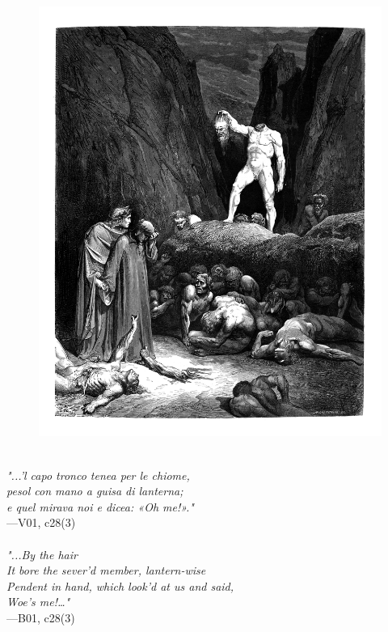 \documentclass[../Dore_vision.tex]{subfiles}
\begin{document}
\begin{figure}[ht]
\centering
\includegraphics[height=\figsize]{illustrations/book_1/V01, c28(3).jpg}
\end{figure}

\begin{center}
\begin{minipage}{0.8\linewidth}
\textit{\\
"...’l capo tronco tenea per le chiome,\\pesol con mano a guisa di lanterna;\\e quel mirava noi e dicea: «Oh me!»."} \\
—V01, c28(3) \\~\\
\textit{"...By the hair\\It bore the sever'd member, lantern-wise\\Pendent in hand, which look'd at us and said,\\ \textquotesingle Woe's me!\textquotesingle…"} \\
—B01, c28(3)
\end{minipage}
\end{center}
\end{document}
